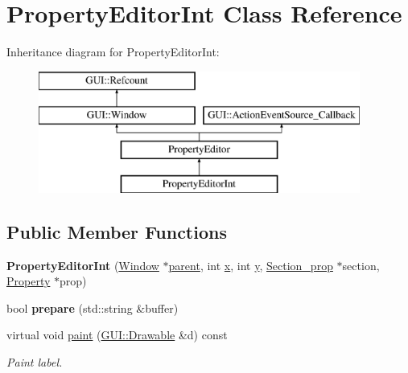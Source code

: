 \hypertarget{classPropertyEditorInt}{\section{Property\-Editor\-Int Class Reference}
\label{classPropertyEditorInt}
}
Inheritance diagram for Property\-Editor\-Int\-:\begin{figure}[H]
\begin{center}
\leavevmode
\includegraphics[height=4.000000cm]{classPropertyEditorInt}
\end{center}
\end{figure}
\subsection*{Public Member Functions}
\begin{DoxyCompactItemize}
\item 
\hypertarget{classPropertyEditorInt_a0f41557774e65f1aa6a57313f3ebf824}{{\bfseries Property\-Editor\-Int} (\hyperlink{classGUI_1_1Window_ae828e9daa964dfc65a3550fb03117d30}{Window} $\ast$\hyperlink{classGUI_1_1Window_a2e593ff65e7702178d82fe9010a0b539}{parent}, int \hyperlink{classGUI_1_1Window_a6ca6a80ca00c9e1d8ceea8d3d99a657d}{x}, int \hyperlink{classGUI_1_1Window_a0ee8e923aff2c3661fc2e17656d37adf}{y}, \hyperlink{classSection__prop}{Section\-\_\-prop} $\ast$section, \hyperlink{classProperty}{Property} $\ast$prop)}\label{classPropertyEditorInt_a0f41557774e65f1aa6a57313f3ebf824}

\item 
\hypertarget{classPropertyEditorInt_a5905c05b04394d9c0f9ee1c332df339e}{bool {\bfseries prepare} (std\-::string \&buffer)}\label{classPropertyEditorInt_a5905c05b04394d9c0f9ee1c332df339e}

\item 
\hypertarget{classPropertyEditorInt_a3e112a47c5f4f8fd49c2c0e7208031de}{virtual void \hyperlink{classPropertyEditorInt_a3e112a47c5f4f8fd49c2c0e7208031de}{paint} (\hyperlink{classGUI_1_1Drawable}{G\-U\-I\-::\-Drawable} \&d) const }\label{classPropertyEditorInt_a3e112a47c5f4f8fd49c2c0e7208031de}

\begin{DoxyCompactList}\small\item\em Paint label. \end{DoxyCompactList}\end{DoxyCompactItemize}
